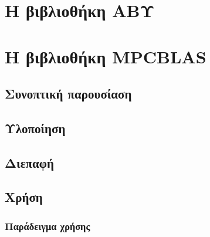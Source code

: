 \section{Η βιβλιοθήκη ΑΒΥ}

\section{Η βιβλιοθήκη MPCBLAS}

\subsection{Συνοπτική παρουσίαση}

\subsection{Υλοποίηση}

\subsection{Διεπαφή}

\subsection{Χρήση}

\subsubsection{Παράδειγμα χρήσης}